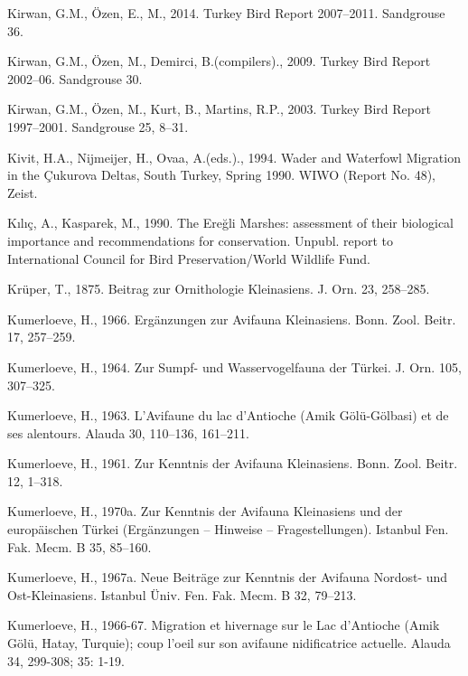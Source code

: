\documentclass[
  a4paper,
  DIV=11,
  numbers=noendperiod]{scrartcl}
\newlength{\cslhangindent}
\newenvironment{CSLReferences}[2] %
 {\begin{list}{}{%
  \setlength{\itemindent}{0pt}
  \setlength{\leftmargin}{0pt}
  \setlength{\parsep}{0pt}
  \ifodd #1
   \setlength{\leftmargin}{\cslhangindent}
   \setlength{\itemindent}{-1\cslhangindent}
  \fi
  \setlength{\itemsep}{#2\baselineskip}}}
 {\end{list}}
\begin{document}
\begin{CSLReferences}{1}{0}
Kirwan, G.M., Özen, E., M., 2014. {Turkey Bird Report 2007--2011}.
Sandgrouse 36.

Kirwan, G.M., Özen, M., Demirci, B.(compilers)., 2009. {Turkey Bird
Report 2002--06}. Sandgrouse 30.

Kirwan, G.M., Özen, M., Kurt, B., Martins, R.P., 2003. {Turkey Bird
Report 1997--2001}. Sandgrouse 25, 8--31.

Kivit, H.A., Nijmeijer, H., Ovaa, A.(eds.)., 1994. {Wader and Waterfowl
Migration in the Çukurova Deltas, South Turkey, Spring 1990}. WIWO
(Report No. 48), Zeist.

Kılıç, A., Kasparek, M., 1990. {The Ereğli Marshes: assessment of their
biological importance and recommendations for conservation}. Unpubl.
report to International Council for Bird Preservation/World Wildlife
Fund.

Krüper, T., 1875. {Beitrag zur Ornithologie Kleinasiens}. J. Orn. 23,
258--285.

Kumerloeve, H., 1966. {Ergänzungen zur Avifauna Kleinasiens}. Bonn.
Zool. Beitr. 17, 257--259.

Kumerloeve, H., 1964. {Zur Sumpf- und Wasservogelfauna der Türkei}. J.
Orn. 105, 307--325.

Kumerloeve, H., 1963. {L'Avifaune du lac d'Antioche (Amik Gölü-Gölbasi)
et de ses alentours}. Alauda 30, 110--136, 161--211.

Kumerloeve, H., 1961. {Zur Kenntnis der Avifauna Kleinasiens}. Bonn.
Zool. Beitr. 12, 1--318.

Kumerloeve, H., 1970a. {Zur Kenntnis der Avifauna Kleinasiens und der
europäischen Türkei (Ergänzungen -- Hinweise -- Fragestellungen)}.
Istanbul Fen. Fak. Mecm. B 35, 85--160.

Kumerloeve, H., 1967a. {Neue Beiträge zur Kenntnis der Avifauna Nordost-
und Ost-Kleinasiens}. Istanbul Üniv. Fen. Fak. Mecm. B 32, 79--213.

Kumerloeve, H., 1966-67. {Migration et hivernage sur le Lac d'Antioche
(Amik Gölü, Hatay, Turquie); coup l'oeil sur son avifaune nidificatrice
actuelle}. Alauda 34, 299-308; 35: 1-19.


\end{CSLReferences}
\end{document}
